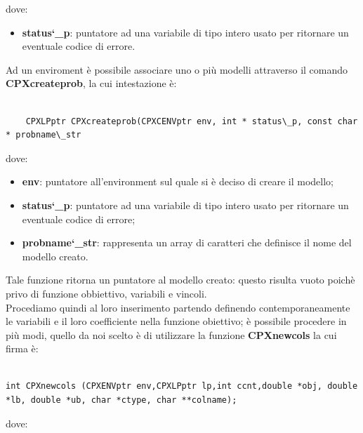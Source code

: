 \documentclass[11pt]{article}
\begin{document}
dove:

\begin{itemize}
\item \textbf{status\char`\_p}: puntatore ad una variabile di tipo intero usato per ritornare un eventuale codice di errore.
\end{itemize}


Ad un enviroment è possibile associare uno o più modelli attraverso il comando \textbf{CPXcreateprob}, la cui intestazione è:

\begin{lstlisting}

    CPXLPptr CPXcreateprob(CPXCENVptr env, int * status\_p, const char * probname\_str

\end{lstlisting}


dove:

\begin{itemize}
    \item \textbf{env}: puntatore all'environment sul quale si è deciso di creare il modello;
    \item \textbf{status\char`\_p}: puntatore ad una variabile di tipo intero usato per ritornare un eventuale codice di errore;
    \item \textbf{probname\char`\_str}: rappresenta un array di caratteri che definisce il nome del modello creato.
\end{itemize}

Tale funzione ritorna un puntatore al modello creato: questo risulta vuoto poichè privo di funzione obbiettivo, variabili e vincoli.\\

Procediamo quindi al loro inserimento partendo definendo contemporaneamente le variabili e il loro coefficiente nella funzione obiettivo; è possibile procedere in più modi, quello da noi scelto è di utilizzare la funzione \textbf{CPXnewcols} la cui firma è:


\begin{lstlisting}

int CPXnewcols (CPXENVptr env,CPXLPptr lp,int ccnt,double *obj, double *lb, double *ub, char *ctype, char **colname);

\end{lstlisting}

dove:
\end{document}
